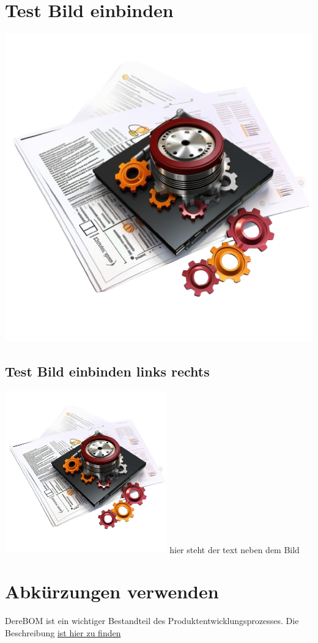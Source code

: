 \section{Test Bild einbinden}
\setlength{\columnwidth}{15cm} %
\centering
\includegraphics[width=14cm,frame=0.25pt,vspace=1cm]{pics/logo}
\subsection{Test Bild einbinden links rechts}
\begin{eintrag2}{
		\includegraphics[width=7cm,frame=0.25pt]{pics/logo}} 	hier steht der text neben dem Bild
\end{eintrag2}
\section{Abkürzungen verwenden}

Der\ac{eBOM} ist ein wichtiger Bestandteil des Produktentwicklungsprozesses. Die Beschreibung  \href{https://www.namsu.de/Extra/pakete/Acro.html}{ ist hier zu finden}